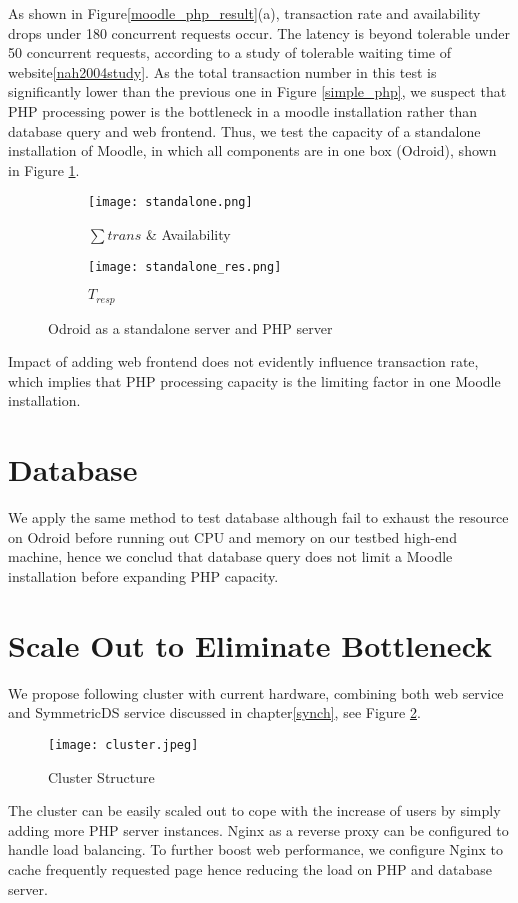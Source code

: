 As shown in Figure\ref{moodle_php_result}(a), transaction rate and availability drops under 180 concurrent requests occur. The latency is beyond tolerable under 50 concurrent requests, according to a study of tolerable waiting time of website\ref{nah2004study}. As the total transaction number in this test is significantly lower than the previous one in Figure \ref{simple_php}, we suspect that PHP processing power is the bottleneck in a moodle installation rather than database query and web frontend. Thus, we test the capacity of a standalone installation of Moodle, in which all components are in one box (Odroid), shown in Figure \ref{standalone}.

\begin{figure}[h]
\centering
\begin{subfigure}{0.45\textwidth}
\centering
\texttt{[image: standalone.png]}
\caption{$\sum trans$ \& Availability}
\end{subfigure}
\begin{subfigure}{0.45\textwidth}
\centering
\texttt{[image: standalone\_res.png]}
\caption{$T_{resp}$}
\end{subfigure}
\caption{Odroid as a standalone server and PHP server}
\label{standalone}
\end{figure}

Impact of adding web frontend does not evidently influence transaction rate, which implies that PHP processing capacity is the limiting factor in one Moodle installation.

\section{Database}
We apply the same method to test database although fail to exhaust the resource on Odroid before running out CPU and memory on our testbed high-end machine, hence we conclud that database query does not limit a Moodle installation before expanding PHP capacity.

\section{Scale Out to Eliminate Bottleneck}
We propose following cluster with current hardware, combining both web service and SymmetricDS service discussed in chapter\ref{synch}, see Figure \ref{cluster}. 

\begin{figure}[h]
\centering
\texttt{[image: cluster.jpeg]}
\caption{Cluster Structure}
\label{cluster}
\end{figure}

The cluster can be easily scaled out to cope with the increase of users by simply adding more PHP server instances. Nginx as a reverse proxy can be configured to handle load balancing. To further boost web performance, we configure Nginx to cache frequently requested page hence reducing the load on PHP and database server.



